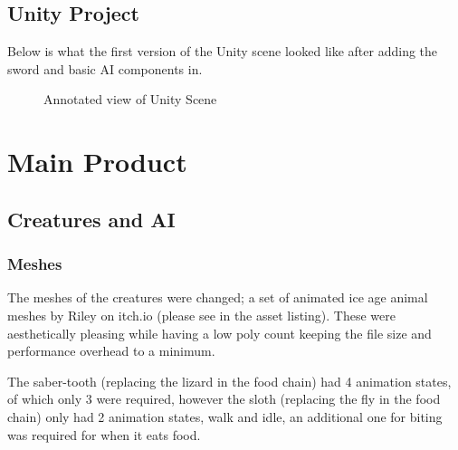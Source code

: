 \documentclass[12pt]{report}
\begin{document}
\subsection{Unity Project}

Below is what the first version of the Unity scene looked like after adding the sword and basic AI components in.

\begin{figure}[H]
    \centering
    \caption{Annotated view of Unity Scene}
\end{figure}



\section{Main Product}
\subsection{Creatures and AI}
\subsubsection{Meshes}
The meshes of the creatures were changed; a set of animated ice age animal meshes by Riley on itch.io (please see in the asset listing). These were aesthetically pleasing while having a low poly count keeping the file size and performance overhead to a minimum. 

The saber-tooth (replacing the lizard in the food chain) had 4 animation states, of which only 3 were required, however the sloth (replacing the fly in the food chain) only had 2 animation states, walk and idle, an additional one for biting was required for when it eats food. 
\end{document}

